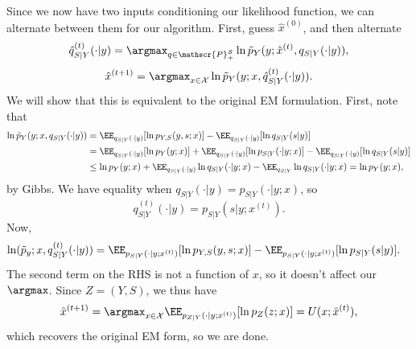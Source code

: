Since we now have two inputs conditioning our likelihood function, we can alternate between them for our algorithm. First, guess $\hat{x}^{(0)}$, and then alternate
\[\hat{q}_{S|Y}^{(t)}(\cdot | y) = \argmax_{q\in \mathscr{P}_+^{\mathcal{S}}}\ln \tilde{p}_Y(y;\hat{x}^{(t)}, q_{S|Y}(\cdot | y)),\] 
\[\hat{x}^{(t+1)} = \argmax_{x\in \mathcal{X}}\ln \tilde{p}_Y(y;x,\hat{q}_{S|Y}^{(t)}(\cdot | y)).\] 
We will show that this is equivalent to the original EM formulation. First, note that 
\begin{align*}
	\ln \tilde{p}_{Y}(y;x,q_{S|Y}(\cdot|y)) &= \EE_{q_{S|Y}(\cdot | y)}[\ln p_{Y,S}(y,s;x)] - \EE_{q_{S|Y}(\cdot | y)}[\ln q_{S|Y}(s|y)] \\
																					&= \EE_{q_{S|Y}(\cdot | y)}[\ln p_{Y}(y;x)] + \EE_{q_{S|Y}(\cdot | y)}[\ln p_{S|Y}(\cdot | y;x)] - \EE_{q_{S|Y}(\cdot | y)}[\ln q_{S|Y}(s|y)] \\
																					&\leq \ln p_Y(y;x) + \EE_{q_{S|Y}(\cdot | y)}\ln q_{S|Y}(\cdot|y;x) - \EE_{q_{S|Y}}\ln q_{S|Y}(\cdot | y;x) = \ln p_Y(y;x), 
\end{align*}
by Gibbs. We have equality when $q_{S|Y}(\cdot | y) = p_{S|Y}(\cdot | y;x)$, so 
\[q^{(t)}_{S|Y}(\cdot | y) = p_{S|Y}(s|y;x^{(t)}).\] 
Now,
\begin{align*}
	\ln (\tilde{p}_y;x,q_{S|Y}^{(t)}(\cdot | y)) &= \EE_{p_{S|Y}(\cdot|y;x^{(t)})}[\ln p_{Y,S}(y,s;x)] - \EE_{p_{S|Y}(\cdot|y;x^{(t)})}[\ln p_{S|Y}(s|y)].
\end{align*}
The second term on the RHS is not a function of $x$, so it doesn't affect our $\argmax$. Since $Z=(Y,S)$, we thus have 
\[\hat{x}^{(t+1)} = \argmax_{x\in \mathcal{X}}\EE_{p_{Z|Y}(\cdot | y;x^{(t)})}[\ln p_{Z}(z;x)] = U(x;\hat{x}^{(t)}),\]
which recovers the original EM form, so we are done.


